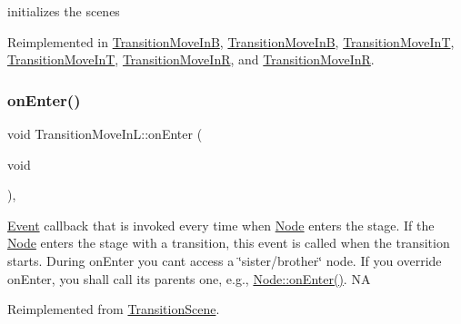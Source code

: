 initializes the scenes 

Reimplemented in \hyperlink{classTransitionMoveInB_ad262522b11cb2c360964857393316437}{Transition\+Move\+InB}, \hyperlink{classTransitionMoveInB_a3e86144d89423882fd847ee5e7e9b4ac}{Transition\+Move\+InB}, \hyperlink{classTransitionMoveInT_a25cb721d845913b43a385931ca1851f2}{Transition\+Move\+InT}, \hyperlink{classTransitionMoveInT_a029a7a031fc78f3a1b46f734c7d429b6}{Transition\+Move\+InT}, \hyperlink{classTransitionMoveInR_abea3ee2e03e712a74ffeb1be776b2ca8}{Transition\+Move\+InR}, and \hyperlink{classTransitionMoveInR_ab9629d0b43632bd10024dbe79b15d411}{Transition\+Move\+InR}.

\mbox{\label{classTransitionMoveInL_a790048ed6247fef9cefd40f39b53d3d5}} 
\subsubsection{\texorpdfstring{on\+Enter()}{onEnter()}\hspace{0.1cm}{\footnotesize\ttfamily [1/2]}}
{\footnotesize\ttfamily void Transition\+Move\+In\+L\+::on\+Enter (\begin{DoxyParamCaption}\item[{void}]{ }\end{DoxyParamCaption})\hspace{0.3cm}{\ttfamily [override]}, {\ttfamily [virtual]}}

\hyperlink{classEvent}{Event} callback that is invoked every time when \hyperlink{classNode}{Node} enters the \textquotesingle{}stage\textquotesingle{}. If the \hyperlink{classNode}{Node} enters the \textquotesingle{}stage\textquotesingle{} with a transition, this event is called when the transition starts. During on\+Enter you can\textquotesingle{}t access a \char`\"{}sister/brother\char`\"{} node. If you override on\+Enter, you shall call its parent\textquotesingle{}s one, e.\+g., \hyperlink{classNode_a7f51764c4afd5018a052b9ef71c03374}{Node\+::on\+Enter()}.  NA 

Reimplemented from \hyperlink{classTransitionScene_aace390a1bd8f3c73bb650a1e256a0f83}{Transition\+Scene}.

\mbox{\label{classTransitionMoveInL_a4cf29668bcdd420cebb6135f80dd81f8}} 
